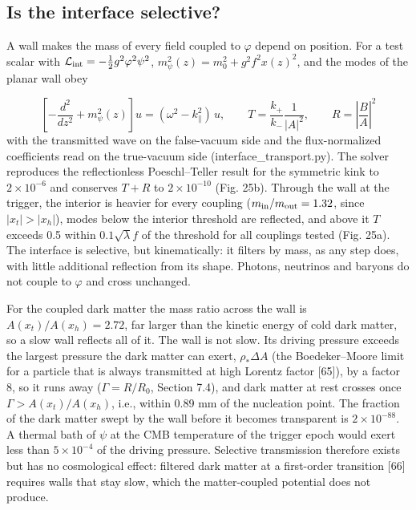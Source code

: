 \documentclass[11pt,a4paper]{article}
\begin{document}
\subsection{Is the interface selective?}
A wall makes the mass of every field coupled to $\varphi$ depend on position. For a test scalar with $\mathcal L_{\rm int}=-\frac12g^2\varphi^2\psi^2$, $m_\psi^2(z)=m_0^2+g^2f^2x(z)^2$, and the modes of the planar wall obey

\begin{equation}
\left[-\frac{d^2}{dz^2}+m_\psi^2(z)\right]u=(\omega^2-k_\parallel^2)\,u,\qquad T=\frac{k_+}{k_-}\frac{1}{|A|^2},\qquad R=\left|\frac{B}{A}\right|^2
\end{equation}
with the transmitted wave on the false-vacuum side and the flux-normalized coefficients read on the true-vacuum side (interface\_transport.py). The solver reproduces the reflectionless Poeschl--Teller result for the symmetric kink to $2\times10^{-6}$ and conserves $T+R$ to $2\times10^{-10}$ (Fig. 25b). Through the wall at the trigger, the interior is heavier for every coupling ($m_{\rm in}/m_{\rm out}=1.32$, since $|x_t|>|x_h|$), modes below the interior threshold are reflected, and above it $T$ exceeds 0.5 within $0.1\sqrt\lambda f$ of the threshold for all couplings tested (Fig. 25a). The interface is selective, but kinematically: it filters by mass, as any step does, with little additional reflection from its shape. Photons, neutrinos and baryons do not couple to $\varphi$ and cross unchanged.

For the coupled dark matter the mass ratio across the wall is $A(x_t)/A(x_h)=2.72$, far larger than the kinetic energy of cold dark matter, so a slow wall reflects all of it. The wall is not slow. Its driving pressure exceeds the largest pressure the dark matter can exert, $\rho_*\Delta A$ (the Boedeker--Moore limit for a particle that is always transmitted at high Lorentz factor [65]), by a factor 8, so it runs away ($\Gamma=R/R_0$, Section 7.4), and dark matter at rest crosses once $\Gamma>A(x_t)/A(x_h)$, i.e., within 0.89 mm of the nucleation point. The fraction of the dark matter swept by the wall before it becomes transparent is $2\times10^{-88}$. A thermal bath of $\psi$ at the CMB temperature of the trigger epoch would exert less than $5\times10^{-4}$ of the driving pressure. Selective transmission therefore exists but has no cosmological effect: filtered dark matter at a first-order transition [66] requires walls that stay slow, which the matter-coupled potential does not produce.
\end{document}
